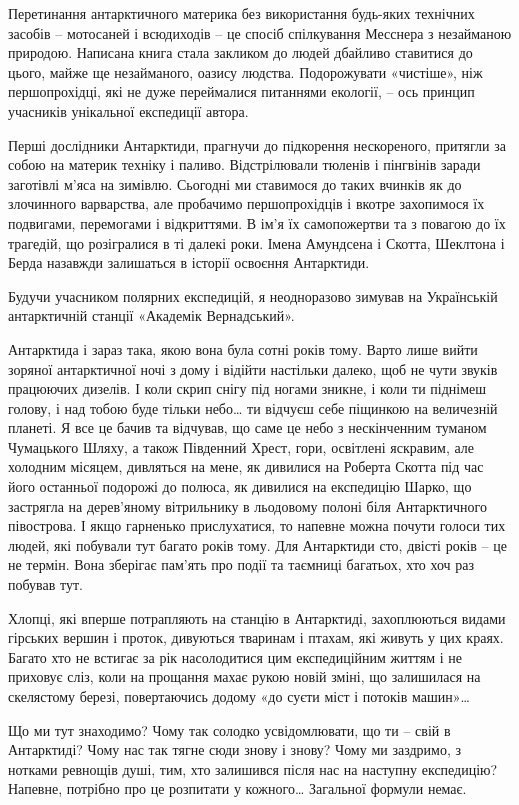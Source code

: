 Перетинання антарктичного материка без використання будь-яких технічних засобів
– мотосаней і всюдиходів – це спосіб спілкування Месснера з незайманою
природою. Написана книга стала закликом до людей дбайливо ставитися до цього,
майже ще незайманого, оазису людства. Подорожувати «чистіше», ніж
першопрохідці, які не дуже переймалися питаннями екології, – ось принцип
учасників унікальної експедиції автора.

Перші дослідники Антарктиди, прагнучи до підкорення нескореного, притягли за
собою на материк техніку і паливо. Відстрілювали тюленів і пінгвінів заради
заготівлі м’яса на зимівлю. Сьогодні ми ставимося до таких вчинків як до
злочинного варварства, але пробачимо першопрохідців і вкотре захопимося їх
подвигами, перемогами і відкриттями. В ім’я їх самопожертви та з повагою до їх
трагедій, що розігралися в ті далекі роки. Імена Амундсена і Скотта, Шеклтона і
Берда назавжди залишаться в історії освоєння Антарктиди.

Будучи учасником полярних експедицій, я неодноразово зимував на Українській
антарктичній станції «Академік Вернадський».

Антарктида і зараз така, якою вона була сотні років тому. Варто лише вийти
зоряної антарктичної ночі з дому і відійти настільки далеко, щоб не чути звуків
працюючих дизелів. І коли скрип снігу під ногами зникне, і коли ти піднімеш
голову, і над тобою буде тільки небо… ти відчуєш себе піщинкою на величезній
планеті. Я все це бачив та відчував, що саме це небо з нескінченним туманом
Чумацького Шляху, а також Південний Хрест, гори, освітлені яскравим, але
холодним місяцем, дивляться на мене, як дивилися на Роберта Скотта під час його
останньої подорожі до полюса, як дивилися на експедицію Шарко, що застрягла на
дерев’яному вітрильнику в льодовому полоні біля Антарктичного півострова. І
якщо гарненько прислухатися, то напевне можна почути голоси тих людей, які
побували тут багато років тому. Для Антарктиди сто, двісті років – це не
термін. Вона зберігає пам’ять про події та таємниці багатьох, хто хоч раз
побував тут.

Хлопці, які вперше потрапляють на станцію в Антарктиді, захоплюються видами
гірських вершин і проток, дивуються тваринам і птахам, які живуть у цих краях.
Багато хто не встигає за рік насолодитися цим експедиційним життям і не
приховує сліз, коли на прощання махає рукою новій зміні, що залишилася на
скелястому березі, повертаючись додому «до суєти міст і потоків машин»… 

Що ми тут знаходимо? Чому так солодко усвідомлювати, що ти – свій в Антарктиді?
Чому нас так тягне сюди знову і знову? Чому ми заздримо, з нотками ревнощів
душі, тим, хто залишився після нас на наступну експедицію? Напевне, потрібно
про це розпитати у кожного… Загальної формули немає.

